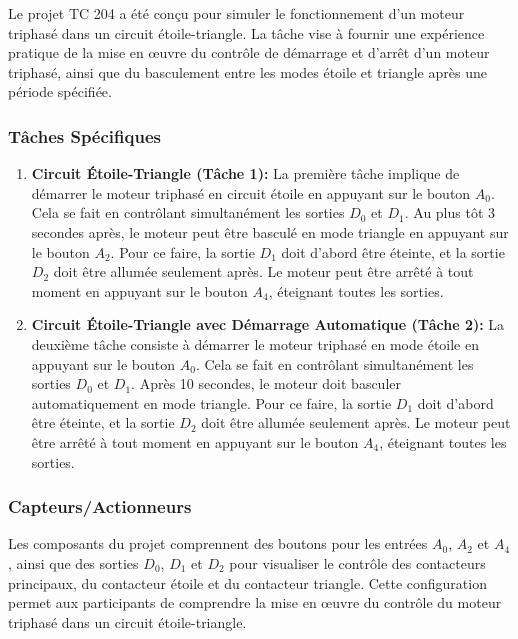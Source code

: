 \documentclass[a4paper,12pt]{report}
\begin{document}
Le projet TC 204 a été conçu pour simuler le fonctionnement d'un moteur triphasé dans un circuit étoile-triangle. La tâche vise à fournir une expérience pratique de la mise en œuvre du contrôle de démarrage et d'arrêt d'un moteur triphasé, ainsi que du basculement entre les modes étoile et triangle après une période spécifiée.

\subsubsection{Tâches Spécifiques}

\begin{enumerate}
    \item \textbf{Circuit Étoile-Triangle (Tâche 1):} 
    La première tâche implique de démarrer le moteur triphasé en circuit étoile en appuyant sur le bouton \(A_0\). Cela se fait en contrôlant simultanément les sorties \(D_0\) et \(D_1\). Au plus tôt 3 secondes après, le moteur peut être basculé en mode triangle en appuyant sur le bouton \(A_2\). Pour ce faire, la sortie \(D_1\) doit d'abord être éteinte, et la sortie \(D_2\) doit être allumée seulement après. Le moteur peut être arrêté à tout moment en appuyant sur le bouton \(A_4\), éteignant toutes les sorties.
    
    \item \textbf{Circuit Étoile-Triangle avec Démarrage Automatique (Tâche 2):} 
    La deuxième tâche consiste à démarrer le moteur triphasé en mode étoile en appuyant sur le bouton \(A_0\). Cela se fait en contrôlant simultanément les sorties \(D_0\) et \(D_1\). Après 10 secondes, le moteur doit basculer automatiquement en mode triangle. Pour ce faire, la sortie \(D_1\) doit d'abord être éteinte, et la sortie \(D_2\) doit être allumée seulement après. Le moteur peut être arrêté à tout moment en appuyant sur le bouton \(A_4\), éteignant toutes les sorties.
\end{enumerate}
\subsubsection{Capteurs/Actionneurs}

Les composants du projet comprennent des boutons pour les entrées \(A_0\), \(A_2\) et \(A_4\), ainsi que des sorties \(D_0\), \(D_1\) et \(D_2\) pour visualiser le contrôle des contacteurs principaux, du contacteur étoile et du contacteur triangle. Cette configuration permet aux participants de comprendre la mise en œuvre du contrôle du moteur triphasé dans un circuit étoile-triangle.
\end{document}
